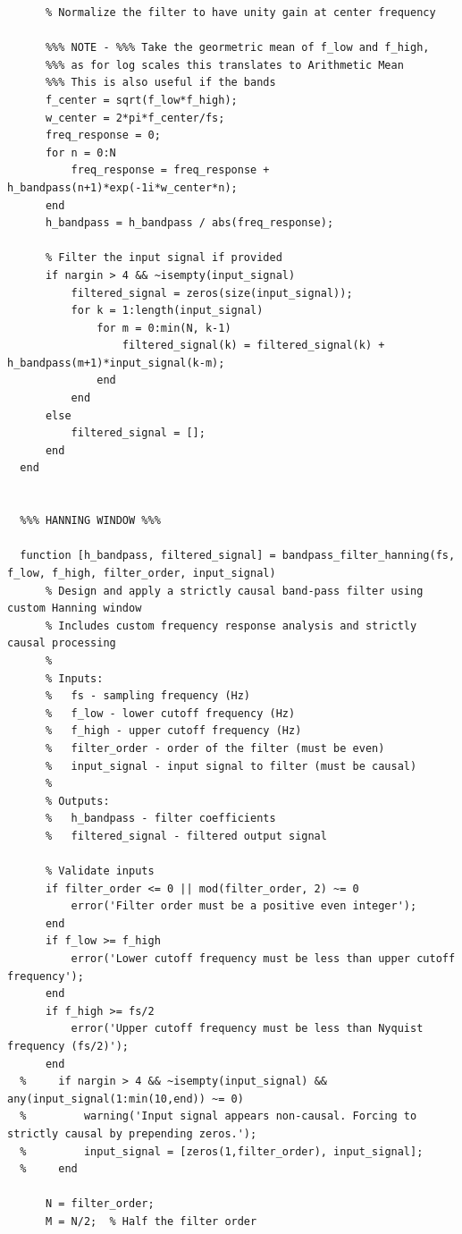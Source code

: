 \documentclass[12pt]{report}
\begin{document}
\begin{lstlisting}
      % Normalize the filter to have unity gain at center frequency
      
      %%% NOTE - %%% Take the geormetric mean of f_low and f_high, 
      %%% as for log scales this translates to Arithmetic Mean
      %%% This is also useful if the bands 
      f_center = sqrt(f_low*f_high); 
      w_center = 2*pi*f_center/fs;
      freq_response = 0;
      for n = 0:N
          freq_response = freq_response + h_bandpass(n+1)*exp(-1i*w_center*n);
      end
      h_bandpass = h_bandpass / abs(freq_response);
      
      % Filter the input signal if provided
      if nargin > 4 && ~isempty(input_signal)
          filtered_signal = zeros(size(input_signal));
          for k = 1:length(input_signal)
              for m = 0:min(N, k-1)
                  filtered_signal(k) = filtered_signal(k) + h_bandpass(m+1)*input_signal(k-m);
              end
          end
      else
          filtered_signal = [];
      end
  end


  %%% HANNING WINDOW %%%

  function [h_bandpass, filtered_signal] = bandpass_filter_hanning(fs, f_low, f_high, filter_order, input_signal)
      % Design and apply a strictly causal band-pass filter using custom Hanning window
      % Includes custom frequency response analysis and strictly causal processing
      %
      % Inputs:
      %   fs - sampling frequency (Hz)
      %   f_low - lower cutoff frequency (Hz)
      %   f_high - upper cutoff frequency (Hz)
      %   filter_order - order of the filter (must be even)
      %   input_signal - input signal to filter (must be causal)
      %
      % Outputs:
      %   h_bandpass - filter coefficients
      %   filtered_signal - filtered output signal
      
      % Validate inputs
      if filter_order <= 0 || mod(filter_order, 2) ~= 0
          error('Filter order must be a positive even integer');
      end
      if f_low >= f_high
          error('Lower cutoff frequency must be less than upper cutoff frequency');
      end
      if f_high >= fs/2
          error('Upper cutoff frequency must be less than Nyquist frequency (fs/2)');
      end
  %     if nargin > 4 && ~isempty(input_signal) && any(input_signal(1:min(10,end)) ~= 0)
  %         warning('Input signal appears non-causal. Forcing to strictly causal by prepending zeros.');
  %         input_signal = [zeros(1,filter_order), input_signal];
  %     end
      
      N = filter_order;
      M = N/2;  % Half the filter order
      

\end{lstlisting}
\end{document}
